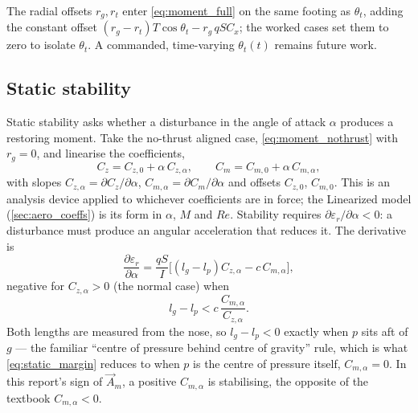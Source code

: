 The radial offsets $r_g,r_t$ enter \autoref{eq:moment_full} on the same footing as $\theta_t$,
adding the constant offset $(r_g-r_t)T\cos\theta_t-r_g\,qSC_x$; the worked cases set them to zero
to isolate $\theta_t$. A commanded, time-varying $\theta_t(t)$ remains future work.

\subsection{Static stability}\label{sec:analysis_stability}
Static stability asks whether a disturbance in the angle of attack $\alpha$ produces a restoring
moment. Take the no-thrust aligned case, \autoref{eq:moment_nothrust} with $r_g=0$, and linearise
the coefficients,
\begin{equation} \label{eq:aero_linearised}
    C_z = C_{z,0} + \alpha\,C_{z,\alpha}, \qquad
    C_m = C_{m,0} + \alpha\,C_{m,\alpha},
\end{equation}
with slopes $C_{z,\alpha}=\partial C_z/\partial\alpha$, $C_{m,\alpha}=\partial C_m/\partial\alpha$ and
offsets $C_{z,0}$, $C_{m,0}$. This is an analysis device applied to whichever coefficients are in
force; the Linearized model (\autoref{sec:aero_coeffs}) is its form in $\alpha$, $M$ and $Re$.
Stability requires $\partial\varepsilon_r/\partial\alpha<0$: a disturbance must produce an angular
acceleration that reduces it. The derivative is
\begin{equation} \label{eq:dtheta_dalpha}
    \frac{\partial \varepsilon_r}{\partial \alpha} = \frac{qS}{I}\biggl[(l_g - l_p)C_{z,\alpha} - c\,C_{m,\alpha}\biggr],
\end{equation}
negative for $C_{z,\alpha}>0$ (the normal case) when
\begin{equation} \label{eq:static_margin}
    l_g - l_p < c\,\frac{C_{m,\alpha}}{C_{z,\alpha}}.
\end{equation}
Both lengths are measured from the nose, so $l_g-l_p<0$ exactly when $p$ sits aft of $g$ --- the
familiar ``centre of pressure behind centre of gravity'' rule, which is what
\autoref{eq:static_margin} reduces to when $p$ is the centre of pressure itself, $C_{m,\alpha}=0$.
In this report's sign of $\vec{A}_m$, a positive $C_{m,\alpha}$ is stabilising, the opposite of
the textbook $C_{m,\alpha}<0$.

